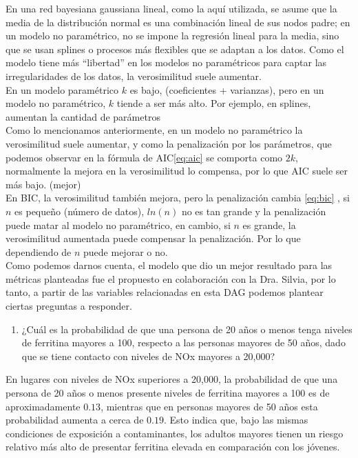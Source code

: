 \documentclass[12pt, letterpaper]{report}
\begin{document}
En una red bayesiana gaussiana lineal, como la aquí utilizada, se asume que la media de la distribución normal es una combinación lineal de sus nodos padre; en un modelo no paramétrico, no se impone la regresión lineal para la media, sino que se usan splines o procesos más flexibles que se adaptan a los datos. Como el modelo tiene más “libertad” en los modelos no paramétricos para captar las irregularidades de los datos, la verosimilitud suele aumentar.\\

En un modelo paramétrico $k$ es bajo, (coeficientes + varianzas), pero en un modelo no paramétrico, $k$ tiende a ser más alto. Por ejemplo, en splines, aumentan la cantidad de parámetros\\

Como lo mencionamos anteriormente, en un modelo no paramétrico la verosimilitud suele aumentar, y como la penalización por los parámetros, que podemos observar en la fórmula de AIC\ref{eq:aic} se comporta como $2k$, normalmente la mejora en la verosimilitud lo compensa, por lo que AIC suele ser más bajo. (mejor)\\

En BIC, la verosimilitud también mejora, pero la penalización cambia \ref{eq:bic} , si $n$ es pequeño (número de datos), $ln(n)$ no es tan grande y la penalización puede matar al modelo no paramétrico, en cambio, si $n$ es grande, la verosimilitud aumentada puede compensar la penalización. Por lo que dependiendo de $n$ puede mejorar o no.\\

Como podemos darnos cuenta, el modelo que dio un mejor resultado para las métricas planteadas fue el propuesto en colaboración con la Dra. Silvia, por lo tanto, a partir de las variables relacionadas en esta DAG podemos plantear ciertas preguntas a responder.
\\

\begin{enumerate}
    \item ¿Cuál es la probabilidad de que una persona de 20 años o menos tenga niveles de ferritina mayores a 100, respecto a las personas mayores de 50 años, dado que se tiene contacto con niveles de NOx mayores a 20,000?
\end{enumerate}

En lugares con niveles de NOx superiores a 20,000, la probabilidad de que una persona de 20 años o menos presente niveles de ferritina mayores a 100 es de aproximadamente \(0.13\), mientras que en personas mayores de 50 años esta probabilidad aumenta a cerca de \(0.19\). Esto indica que, bajo las mismas condiciones de exposición a contaminantes, los adultos mayores tienen un riesgo relativo más alto de presentar ferritina elevada en comparación con los jóvenes.\\
\end{document}
